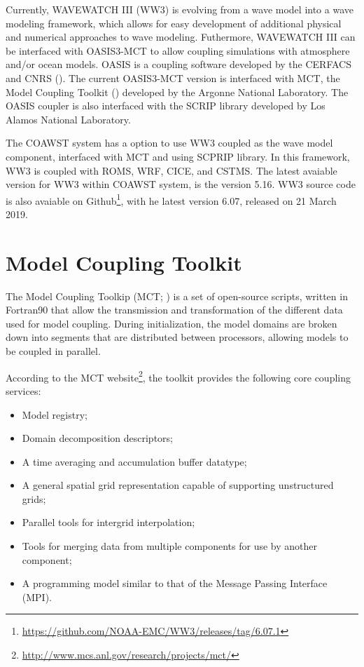  Currently,  WAVEWATCH III (WW3) is evolving from a wave model into a wave modeling framework, which allows for easy development of additional 
physical and numerical approaches to wave modeling. Futhermore,  WAVEWATCH III can be interfaced with OASIS3-MCT to allow coupling simulations with 
atmosphere and/or ocean models. OASIS is a coupling software developed by the CERFACS and CNRS (\cite{Valcke2013}). The current OASIS3-MCT version is 
interfaced with MCT, the Model Coupling Toolkit (\cite{Larson2005}) developed by the Argonne National Laboratory. The OASIS coupler is also interfaced 
with the SCRIP library developed by Los Alamos National Laboratory. 
\bigskip

 The COAWST system has a option to use WW3 coupled as the wave model component, interfaced with MCT and using SCPRIP library. In this framework, WW3 is 
coupled with ROMS, WRF, CICE, and CSTMS. The latest avaiable version for WW3 within COAWST system, 
is the version 5.16. WW3 source code is also avaiable on Github\textcolor{bleu_cite}{\textit{}\footnote{\textcolor{bleu_cite}{\href{https://github.com/NOAA-EMC/WW3/releases/tag/6.07.1}{https://github.com/NOAA-EMC/WW3/releases/tag/6.07.1}}}}, with he latest 
version 6.07, released on 21 March 2019.


\section{Model Coupling Toolkit}\label{mctsecao}
\bigskip

  The Model Coupling Toolkip (MCT; \cite{Larson2005, Jacob2005, Warner2008}) is a set of open-source scripts, written in Fortran90 that allow the transmission 
and transformation of the different data used for model coupling. During initialization, the model domains are broken down into segments that are distributed
between processors, allowing models to be coupled in parallel.
\bigskip

 According to the MCT website\textcolor{bleu_cite}{\textit{}\footnote{\textcolor{bleu_cite}{\href{http://www.mcs.anl.gov/research/projects/mct/}{http://www.mcs.anl.gov/research/projects/mct/}}}}, 
the toolkit provides the following core coupling services:
\bigskip

\begin{itemize}
\item Model registry;
\item Domain decomposition descriptors;
\item A time averaging and accumulation buffer datatype;
\item A general spatial grid representation capable of supporting unstructured grids;
\item Parallel tools for intergrid interpolation;
\item Tools for merging data from multiple components for use by another component;
\item A programming model similar to that of the Message Passing Interface (MPI). 
\end{itemize}
\bigskip

